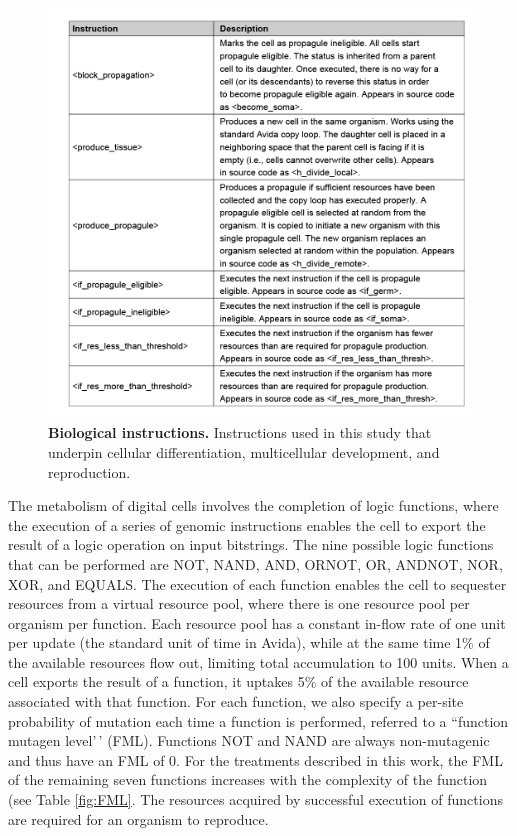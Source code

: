 \documentclass[
]{book}
\begin{document}
\begin{figure}
\centering
\includegraphics{images/Avida_instructions_Biological_Table.png}
\caption{\label{fig:Avida-instructions-Biological-Table}\textbf{Biological instructions.} Instructions used in this study that underpin cellular differentiation, multicellular development, and reproduction.}
\end{figure}

The metabolism of digital cells involves the completion of logic functions, where the execution of a series of genomic instructions enables the cell to export the result of a logic operation on input bitstrings. The nine possible logic functions that can be performed are NOT, NAND, AND, ORNOT, OR, ANDNOT, NOR, XOR, and EQUALS. The execution of each function enables the cell to sequester resources from a virtual resource pool, where there is one resource pool per organism per function. Each resource pool has a constant in-flow rate of one unit per update (the standard unit of time in Avida), while at the same time 1\% of the available resources flow out, limiting total accumulation to 100 units. When a cell exports the result of a function, it uptakes 5\% of the available resource associated with that function. For each function, we also specify a per-site probability of mutation each time a function is performed, referred to a ``function mutagen level'\,' (FML). Functions NOT and NAND are always non-mutagenic and thus have an FML of 0. For the treatments described in this work, the FML of the remaining seven functions increases with the complexity of the function (see Table \ref{fig:FML}. The resources acquired by successful execution of functions are required for an organism to reproduce.
\end{document}
